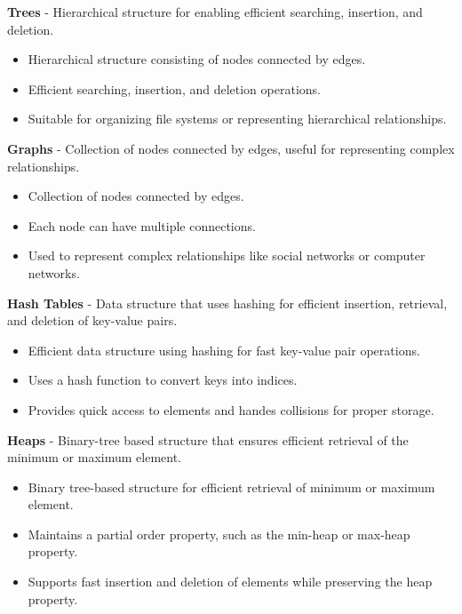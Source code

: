 \begin{solution}
    \noindent \textbf{Trees} - Hierarchical structure for enabling efficient searching, insertion, and deletion.
    \begin{itemize}
        \item Hierarchical structure consisting of nodes connected by edges.
        \item Efficient searching, insertion, and deletion operations.
        \item Suitable for organizing file systems or representing hierarchical relationships.
    \end{itemize}

    \noindent \textbf{Graphs} - Collection of nodes connected by edges, useful for representing complex relationships.
    \begin{itemize}
        \item Collection of nodes connected by edges.
        \item Each node can have multiple connections.
        \item Used to represent complex relationships like social networks or computer networks.
    \end{itemize}

    \noindent \textbf{Hash Tables} - Data structure that uses hashing for efficient insertion, retrieval, and deletion of
    key-value pairs.
    \begin{itemize}
        \item Efficient data structure using hashing for fast key-value pair operations.
        \item Uses a hash function to convert keys into indices.
        \item Provides quick access to elements and handes collisions for proper storage.
    \end{itemize}

    \noindent \textbf{Heaps} - Binary-tree based structure that ensures efficient retrieval of the minimum or maximum element.
    \begin{itemize}
        \item Binary tree-based structure for efficient retrieval of minimum or maximum element.
        \item Maintains a partial order property, such as the min-heap or max-heap property.
        \item Supports fast insertion and deletion of elements while preserving the heap property.
    \end{itemize}
\end{solution}

